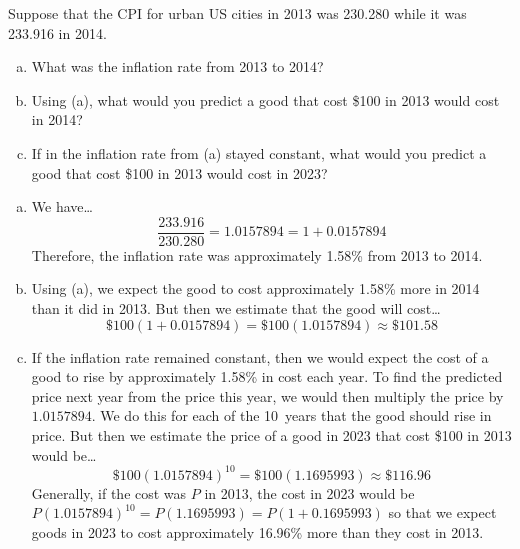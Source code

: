 \documentclass[12pt,letterpaper]{exam}
\begin{document}
\examtitle
{} 
\scores
\bottomline
\newpage

\begin{questions}

\newpage
\question[10] Suppose that the CPI for urban US cities in 2013 was 230.280 while it was 233.916 in 2014. 
	\begin{enumerate}[(a)]
	\item What was the inflation rate from 2013 to 2014?
	\item Using (a), what would you predict a good that cost \$100 in 2013 would cost in 2014?
	\item If in the inflation rate from (a) stayed constant, what would you predict a good that cost \$100 in 2013 would cost in 2023?
	\end{enumerate} \pspace

{\itshape 
\sol 
\begin{enumerate}[(a)]
\item We have\dots
	\[
	\dfrac{233.916}{230.280}= 1.0157894= 1 + 0.0157894
	\]
Therefore, the inflation rate was approximately 1.58\% from 2013 to 2014. \pspace

\item Using (a), we expect the good to cost approximately 1.58\% more in 2014 than it did in 2013. But then we estimate that the good will cost\dots
	\[
	\$100(1 + 0.0157894)= \$100(1.0157894) \approx \$101.58
	\]

\item If the inflation rate remained constant, then we would expect the cost of a good to rise by approximately 1.58\% in cost each year. To find the predicted price next year from the price this year, we would then multiply the price by $1.0157894$. We do this for each of the 10~years that the good should rise in price. But then we estimate the price of a good in 2023 that cost \$100 in 2013 would be\dots
	\[
	\$100(1.0157894)^{10}= \$100(1.1695993) \approx \$116.96
	\]
Generally, if the cost was $P$ in 2013, the cost in 2023 would be $P(1.0157894)^{10}= P(1.1695993)= P(1 + 0.1695993)$ so that we expect goods in 2023 to cost approximately 16.96\% more than they cost in 2013. 
\end{enumerate}
}




\end{questions}
\end{document}
